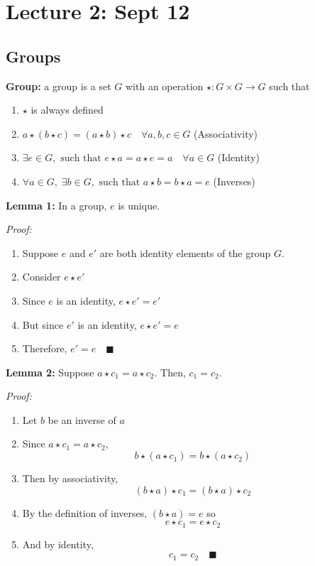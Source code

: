 \documentclass[12pt]{report}
\newcommand{\qed}{\quad \blacksquare}
\begin{document}
\section*{Lecture 2: Sept 12}
\subsection*{Groups}
\textbf{Group:} a group is a set $G$ with an operation $\star: G \times G \to G$ such that 
\begin{enumerate}
    \item $\star$ is always defined 
    \item $a \star (b \star c) = (a \star b) \star c \quad \forall a, b, c \in G$ (Associativity)
    \item $\exists e \in G, \text{ such that } e \star a = a \star e = a \quad \forall a \in G$ (Identity)
    \item $\forall a \in G, \; \exists b \in G, \text{ such that } a \star b = b \star a = e$ (Inverses)
\end{enumerate}

\textbf{Lemma 1:} In a group, $e$ is unique.

\emph{Proof:} 
\begin{enumerate}
    \item Suppose $e$ and $e'$ are both identity elements of the group $G$.
    \item Consider $e \star e'$
    \item Since $e$ is an identity, $e \star e' = e'$
    \item But since $e'$ is an identity, $e \star e' = e$
    \item Therefore, $e' = e \qed$
\end{enumerate} 

\textbf{Lemma 2:} Suppose $a \star c_1 = a \star c_2$. Then, $c_1 = c_2$. 

\emph{Proof:}
\begin{enumerate}
    \item Let $b$ be an inverse of $a$
    \item Since $a \star c_1 = a \star c_2$, 
    \[b\star (a \star c_1) = b \star (a \star c_2)\]
    \item Then by associativity, 
    \[(b \star a) \star c_1 = (b \star a) \star c_2\]
    \item By the definition of inverses, $(b \star a) = e$ so
    \[e \star c_1 = e \star c_2\]
    \item And by identity, 
    \[c_1 = c_2 \qed\]
\end{enumerate}
\end{document}
